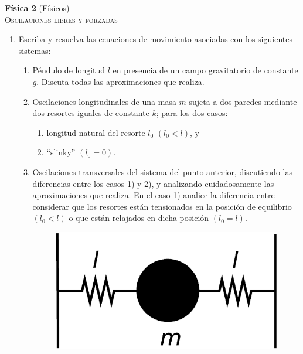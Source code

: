 \documentclass[11pt,spanish,a4paper]{article}
\begin{document}
\begin{center}
\textbf{Física 2} (Físicos) \hfill {}\\
	\textsc{\LARGE Oscilaciones libres y forzadas}
\end{center}


\begin{enumerate}

\section*{Oscilador armónico de un único grado de libertad}

\item Escriba y resuelva las ecuaciones de movimiento asociadas con los siguientes sistemas: 
\begin{enumerate}
	\item Péndulo de longitud $l$ en presencia de un campo gravitatorio de constante $g$.
	Discuta todas las aproximaciones que realiza.
	\item Oscilaciones longitudinales de una masa $m$ sujeta a dos paredes mediante dos resortes iguales de constante $k$; para los dos casos: 
	\begin{enumerate}
		\item longitud natural del resorte $l_{0}$ $(l_{0}<l)$, y 
		\item ``slinky'' $(l_{0}=0)$. 
	\end{enumerate}
	\item Oscilaciones transversales del sistema del punto anterior, discutiendo las diferencias entre los casos 1) y 2), y analizando cuidadosamente las aproximaciones que realiza.
	En el caso 1) analice la diferencia entre considerar que los resortes están tensionados en la posición de equilibrio $(l_{0}<l)$ o que están relajados en dicha posición $(l_0= l)$.
	\begin{figure}[H]
	\centering{}\includegraphics[clip,scale=0.25]{ej1-1}
	\end{figure}
\end{enumerate}



\end{enumerate}
\end{document}
